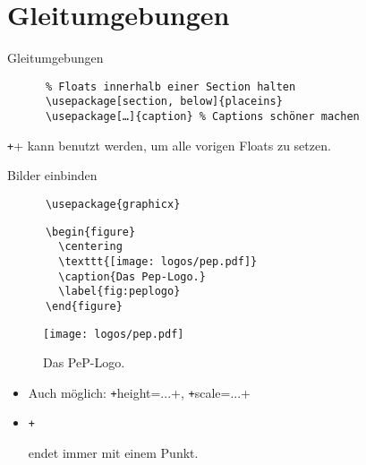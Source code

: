 \section{Gleitumgebungen}
\begin{frame}[fragile]{
  Gleitumgebungen
  \hfill
}
  \begin{Packages}
    \begin{verbatim}
      % Floats innerhalb einer Section halten
      \usepackage[section, below]{placeins}
      \usepackage[…]{caption} % Captions schöner machen
    \end{verbatim}
  \end{Packages}

  \texttt+\FloatBarrier+ kann benutzt werden, um alle vorigen Floats zu setzen.
\end{frame}

\begin{frame}[fragile]{
  Bilder einbinden
  \hfill
}
  \begin{Packages}
    \begin{verbatim}
      \usepackage{graphicx}
    \end{verbatim}
  \end{Packages}
  \begin{CodeExample}{0.7}
    \begin{verbatim}
      \begin{figure}
        \centering
        \texttt{[image: logos/pep.pdf]}
        \caption{Das Pep-Logo.}
        \label{fig:peplogo}
      \end{figure}
    \end{verbatim}
  \CodeResult
    \begin{figure}
      \centering
      \texttt{[image: logos/pep.pdf]}
      \caption{Das PeP-Logo.}
      \label{fig:peplogo}
    \end{figure}
  \end{CodeExample}
  \vspace{5pt}
  \begin{itemize}
    \item Auch möglich: \texttt+height=...+, \texttt+scale=...+
    \item \texttt+\caption+ endet immer mit einem Punkt.
  \end{itemize}
\end{frame}

